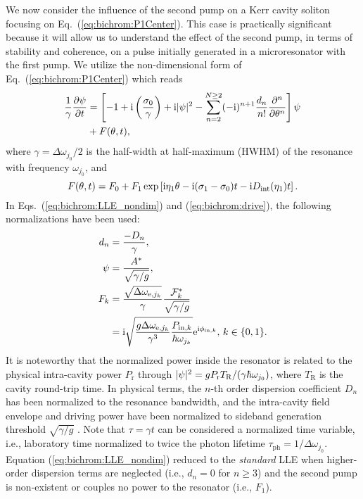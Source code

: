 We now consider the influence of the second pump on a Kerr cavity soliton focusing on Eq.~(\ref{eq:bichrom:P1Center}). This case is practically significant because it will allow us to understand the effect of the second pump, in terms of stability and coherence, on a pulse initially generated in a microresonator with the first pump. We utilize the non-dimensional form of Eq.~(\ref{eq:bichrom:P1Center}) which reads
%
\begin{align} \label{eq:bichrom:LLE_nondim}
\frac{1}{\gamma} \frac{\partial \psi}{\partial t} &= \left[ -1 + \mathrm{i} \left( \frac{\sigma_0}{\gamma} \right) + \mathrm{i} |\psi|^2 - \sum_{n=2}^{N \ge 2} (-\mathrm{i})^{n+1} \frac{d_n}{n!}\frac{\partial^n}{\partial\theta^n} \right] \psi \nonumber \\
& + F(\theta, t),
\end{align}
%
where $\gamma = \Delta \omega_{j_0} / 2$ is the half-width at half-maximum (HWHM) of the resonance with frequency $\omega_{j_0}$, and
%
\begin{equation}\label{eq:bichrom:drive}
F(\theta, t) = F_0 + F_1 \exp \left[ \mathrm{i} \eta_1 \theta - \mathrm{i} (\sigma_1 -  \sigma_0) t - \mathrm{i} D_\mathrm{int} (\eta_1) t \right].
\end{equation}
%
In Eqs.~(\ref{eq:bichrom:LLE_nondim}) and (\ref{eq:bichrom:drive}), the following normalizations have been used:
%
\begin{align}
d_n & =\frac{-D_n}{\gamma} , \\
\psi &= \frac{A^*}{\sqrt{ \gamma / g }}, \\
F_k &= \frac{\sqrt{\Delta \omega_{\mathrm{e},j_k}}}{\gamma} \frac{\mathcal{F}_k^*}{\sqrt{ \gamma / g }} \nonumber \\
&= \mathrm{i} \sqrt{\frac{g \Delta \omega_{\mathrm{e},j_k}}{\gamma^{3}} \frac{P_{\mathrm{in},k}}{\hbar \omega_{j_k}}} \mathrm{e}^{\mathrm{i} \phi_{\mathrm{in},k}}, \, k \in \{ 0, 1 \} \label{eq:bichrom:Fk}.
\end{align}
%
It is noteworthy that the normalized power inside the resonator is related to the physical intra-cavity power $P_\mathrm{r}$ through $\lvert\psi\rvert^2 = g P_\mathrm{r} T_\mathrm{R} / (\gamma \hbar \omega_{j_0})$, where $T_\mathrm{R}$ is the cavity round-trip time. In physical terms, the $n$-th order dispersion coefficient $D_n$ has been normalized to the resonance bandwidth, and the intra-cavity field envelope and driving power have been normalized to sideband generation threshold $\sqrt{\gamma / g}$ \cite{matsko2005hyperparametric, chembo2010modal}. Note that $\tau = \gamma t$ can be considered a normalized time variable, i.e., laboratory time normalized to twice the photon lifetime $\tau_\mathrm{ph} = 1/\Delta \omega_{j_0}$. Equation (\ref{eq:bichrom:LLE_nondim}) reduced to the \emph{standard} LLE \cite{lugiato1987spatial, chembo2013spatiotemporal} when  higher-order dispersion terms are neglected (i.e., $d_n = 0$ for $n \ge 3$) and the second pump is non-existent or couples no power to the resonator (i.e., $F_1$).

